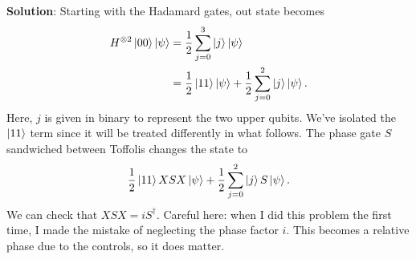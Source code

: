 \documentclass{book}
\begin{document}
    \textbf{Solution}: Starting with the Hadamard gates, out state becomes
    \begin{align}
    \begin{aligned}
        H^{\otimes 2}\ket{00}\ket{\psi} &=\frac{1}{2} \sum_{j=0}^3 \ket{j} \ket{\psi} \\
        &=\frac{1}{2}\ket{11}\ket{\psi} + \frac{1}{2}\sum_{j=0}^2 \ket{j}\ket{\psi}.
    \end{aligned}
    \end{align}
    Here, $j$ is given in binary to represent the two upper qubits. We've isolated the $\ket{11}$ term since it will be treated differently in what follows. The phase gate $S$ sandwiched between Toffolis changes the state to
    \begin{align} \label{eq:4.41_toffs}
    \begin{aligned}
        \frac{1}{2}\ket{11}XSX\ket{\psi} + \frac{1}{2}\sum_{j=0}^2 \ket{j}S\ket{\psi}.
    \end{aligned}
    \end{align}
    We can check that $XSX = i S^\dagger$. Careful here: when I did this problem the first time, I made the mistake of neglecting the phase factor $i$. This becomes a relative phase due to the controls, so it does matter.
\end{document}
